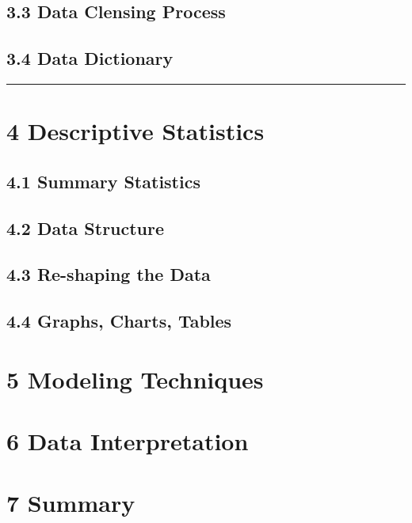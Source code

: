 \documentclass[]{article}
\begin{document}
\subsection{3.3 Data Clensing Process}\label{data-clensing-process}

\subsection{3.4 Data Dictionary}\label{data-dictionary}

\begin{center}\rule{0.5\linewidth}{\linethickness}\end{center}

\section{4 Descriptive Statistics}\label{descriptive-statistics}

\subsection{4.1 Summary Statistics}\label{summary-statistics}

\subsection{4.2 Data Structure}\label{data-structure}

\subsection{4.3 Re-shaping the Data}\label{re-shaping-the-data}

\subsection{4.4 Graphs, Charts, Tables}\label{graphs-charts-tables}

\section{5 Modeling Techniques}\label{modeling-techniques}

\section{6 Data Interpretation}\label{data-interpretation}

\section{7 Summary}\label{summary}
\end{document}
